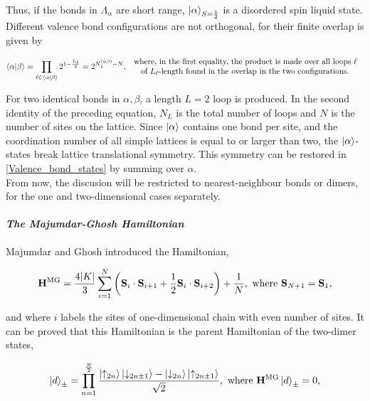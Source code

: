 Thus, if the bonds in $\Lambda_{\alpha}$ are short range, $\ket{\alpha}_{S=\frac{1}{2}}$ is a disordered spin liquid state. Different valence bond configurations are not orthogonal, for their finite overlap is given by 

\begin{equation}
    \bra{\alpha}\ket{\beta} = \prod_{\ell \in \bra{\alpha}\ket{\beta}} 2^{1- \frac{L_{\ell}}{2}} = 2^{N_{L}^{(\alpha \beta)} - N}, \begin{array}{c}
         \textnormal{ where, in the first equality, the product is made over all loops $\ell$  } \\
         \textnormal{ of $L_{\ell}$-length found in the overlap in the two configurations.  }
    \end{array} 
\end{equation}

For two identical bonds in $\alpha, \beta$, a length $L = 2$ loop is produced. In the second identity of the preceding equation, $N_L$ is the total number of loops and $N$ is the number of sites on the lattice. Since $\ket{\alpha}$ contains one bond per site, and the coordination number of all simple lattices is equal to or larger than two, the $\ket{\alpha}$-states break lattice translational symmetry. This symmetry can be restored in \cref{Valence_bond_states} by summing over $\alpha$. \\

From now, the discusion will be restricted to nearest-neighbour bonds or dimers, for the one and two-dimensional cases separately. \\

\paragraph{\textit{The Majumdar-Ghosh Hamiltonian}}

Majumdar and Ghosh introduced the Hamiltonian,

\begin{equation}
    {\bf H}^{\textnormal{MG}} = \frac{4 |K|}{3} \sum_{i=1}^N \bigg({\bf S}_i \cdot {\bf S}_{i+1} + \frac{1}{2} {\bf S}_{i} \cdot {\bf S}_{i+2}\bigg) + \frac{1}{N}, \textnormal{ where } {\bf S}_{N+1} = {\bf S}_1,
\end{equation}

and where $i$ labels the sites of one-dimensional chain with even number of sites. It can be proved that this Hamiltonian is the parent Hamiltonian of the two-dimer states, 

\begin{equation}
    \ket{d}_{\pm} = \prod_{n=1}^{\frac{N}{2}} \frac{\ket{\uparrow_{2n}} \ket{\downarrow_{2n\pm1}} - \ket{\downarrow_{2n}} \ket{\uparrow_{2n \pm 1}}}{\sqrt{2}}, \textnormal{ where } {\bf H}^{\textnormal{MG}} \ket{d}_{\pm} = 0, 
    \label{dimer_states}
\end{equation}

